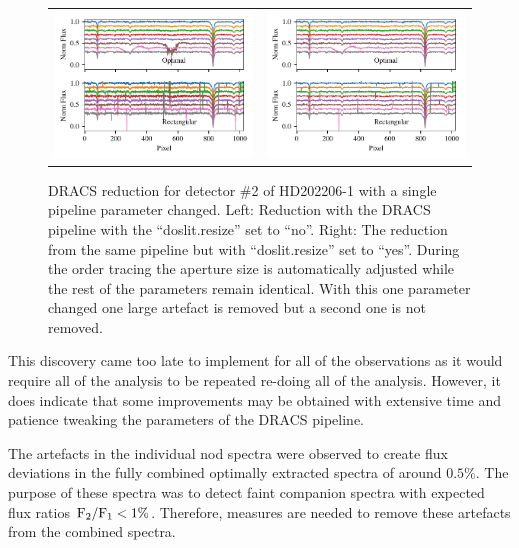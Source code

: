 \begin{figure}
    \centering
    \begin{tabular}{cc}
    \includegraphics[width=0.5\linewidth]{figures/reduction/bp_plots/non_resized_nods_HD202206-1_chip_2} & \includegraphics[width=0.5\linewidth]{figures/reduction/bp_plots/resized_nods_HD202206-1_chip_2}\\
    \end{tabular}
    \caption{{DRACS} reduction for detector \#2 of HD202206-1 with a single pipeline parameter changed. Left: Reduction with the DRACS pipeline with the ``doslit.resize'' set to ``no''. Right: The reduction from the same pipeline but with ``doslit.resize'' set to ``yes''. During the order tracing the aperture size is automatically adjusted while the rest of the parameters remain identical. With this one parameter changed one large artefact is removed but a second one is not removed.}
    \label{fig:resizednods}
\end{figure}

This discovery came too late to implement for all of the observations as it would require all of the analysis to be repeated re-doing all of the analysis. However, it does indicate that some improvements may be obtained with extensive time and patience tweaking the parameters of the {DRACS} pipeline.

The artefacts in the individual nod spectra were observed to create flux deviations in the fully combined optimally extracted spectra of around \(0.5\%\). The purpose of these spectra was to detect faint companion spectra with expected flux ratios \(\rm {F_2}/{F_1} < 1\%\). Therefore, measures are needed to remove these artefacts from the combined spectra.

